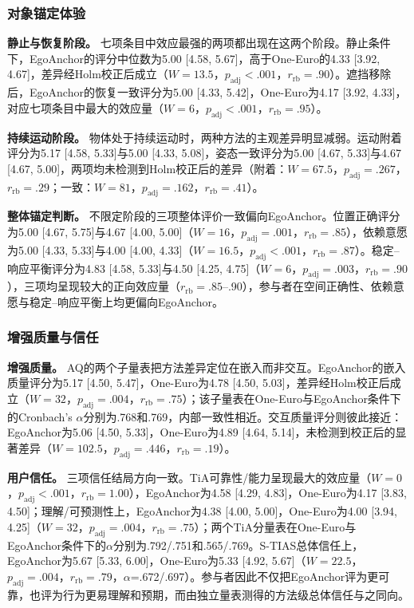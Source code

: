 \documentclass[review]{vgtc}
\begin{document}
\subsubsection{对象锚定体验}

\textbf{静止与恢复阶段。}
七项条目中效应最强的两项都出现在这两个阶段。静止条件下，EgoAnchor的评分中位数为5.00 [4.58, 5.67]，高于One-Euro的4.33 [3.92, 4.67]，差异经Holm校正后成立（$W=13.5$，$p_{\mathrm{adj}}<.001$，$r_{\mathrm{rb}}=.90$）。遮挡移除后，EgoAnchor的恢复一致评分为5.00 [4.33, 5.42]，One-Euro为4.17 [3.92, 4.33]，对应七项条目中最大的效应量（$W=6$，$p_{\mathrm{adj}}<.001$，$r_{\mathrm{rb}}=.95$）。

\textbf{持续运动阶段。}
物体处于持续运动时，两种方法的主观差异明显减弱。运动附着评分为5.17 [4.58, 5.33]与5.00 [4.33, 5.08]，姿态一致评分为5.00 [4.67, 5.33]与4.67 [4.67, 5.00]，两项均未检测到Holm校正后的差异（附着：$W=67.5$，$p_{\mathrm{adj}}=.267$，$r_{\mathrm{rb}}=.29$；一致：$W=81$，$p_{\mathrm{adj}}=.162$，$r_{\mathrm{rb}}=.41$）。

\textbf{整体锚定判断。}
不限定阶段的三项整体评价一致偏向EgoAnchor。位置正确评分为5.00 [4.67, 5.75]与4.67 [4.00, 5.00]（$W=16$，$p_{\mathrm{adj}}=.001$，$r_{\mathrm{rb}}=.85$），依赖意愿为5.00 [4.33, 5.33]与4.00 [4.00, 4.33]（$W=16.5$，$p_{\mathrm{adj}}<.001$，$r_{\mathrm{rb}}=.87$）。稳定--响应平衡评分为4.83 [4.58, 5.33]与4.50 [4.25, 4.75]（$W=6$，$p_{\mathrm{adj}}=.003$，$r_{\mathrm{rb}}=.90$），三项均呈现较大的正向效应量（$r_{\mathrm{rb}}=.85$--.90），参与者在空间正确性、依赖意愿与稳定--响应平衡上均更偏向EgoAnchor。

\subsubsection{增强质量与信任}

\textbf{增强质量。}
AQ的两个子量表把方法差异定位在嵌入而非交互。EgoAnchor的嵌入质量评分为5.17 [4.50, 5.47]，One-Euro为4.78 [4.50, 5.03]，差异经Holm校正后成立（$W=32$，$p_{\mathrm{adj}}=.004$，$r_{\mathrm{rb}}=.75$）；该子量表在One-Euro与EgoAnchor条件下的Cronbach's $\alpha$分别为.768和.769，内部一致性相近。交互质量评分则彼此接近：EgoAnchor为5.06 [4.50, 5.33]，One-Euro为4.89 [4.64, 5.14]，未检测到校正后的显著差异（$W=102.5$，$p_{\mathrm{adj}}=.446$，$r_{\mathrm{rb}}=.19$）。

\textbf{用户信任。}
三项信任结局方向一致。TiA可靠性/能力呈现最大的效应量（$W=0$，$p_{\mathrm{adj}}<.001$，$r_{\mathrm{rb}}=1.00$），EgoAnchor为4.58 [4.29, 4.83]，One-Euro为4.17 [3.83, 4.50]；理解/可预测性上，EgoAnchor为4.38 [4.00, 5.00]，One-Euro为4.00 [3.94, 4.25]（$W=32$，$p_{\mathrm{adj}}=.004$，$r_{\mathrm{rb}}=.75$）；两个TiA分量表在One-Euro与EgoAnchor条件下的$\alpha$分别为.792/.751和.565/.769。S-TIAS总体信任上，EgoAnchor为5.67 [5.33, 6.00]，One-Euro为5.33 [4.92, 5.67]（$W=22.5$，$p_{\mathrm{adj}}=.004$，$r_{\mathrm{rb}}=.79$，$\alpha$=.672/.697）。参与者因此不仅把EgoAnchor评为更可靠，也评为行为更易理解和预期，而由独立量表测得的方法级总体信任与之同向。
\end{document}
